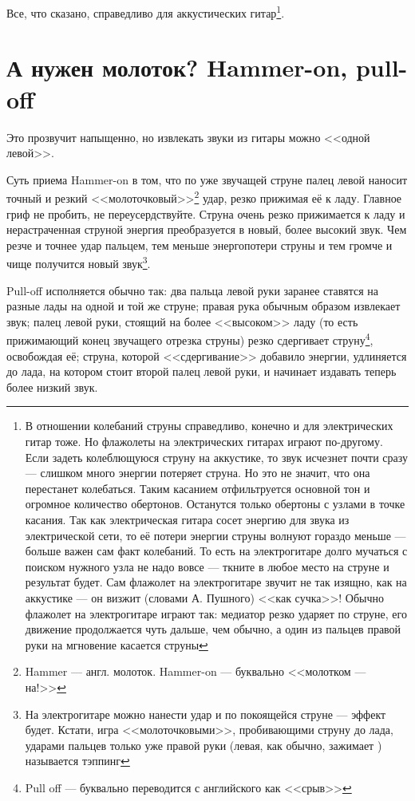 Все, что сказано, справедливо для аккустических гитар\footnote{В отношении колебаний струны справедливо, конечно и для электрических гитар тоже. Но флажолеты на электрических гитарах играют по-другому. Если задеть колеблющуюся струну на аккустике, то звук исчезнет почти сразу --- слишком много энергии потеряет струна. Но это не значит, что она перестанет колебаться. Таким касанием отфильтруется основной тон и огромное количество обертонов. Останутся только обертоны с узлами в точке касания. Так как электрическая гитара сосет энергию для звука из электрической сети, то её потери энергии струны волнуют гораздо меньше --- больше важен сам факт колебаний. То есть на электрогитаре долго мучаться с поиском нужного узла не надо вовсе --- ткните в любое место на струне и результат будет. Сам флажолет на электрогитаре звучит не так изящно, как на аккустике --- он визжит (словами А. Пушного) <<как сучка>>! Обычно флажолет на электрогитаре играют так: медиатор резко ударяет по струне, его движение продолжается чуть дальше, чем обычно, а один из пальцев правой руки на мгновение касается струны}.


\section{А нужен молоток? Hammer-on, pull-off}

Это прозвучит напыщенно, но извлекать звуки из гитары можно <<одной левой>>.

Суть приема Hammer-on в том, что по уже звучащей струне палец левой наносит точный и резкий <<молоточковый>>\footnote{Hammer --- англ. молоток. Hammer-on --- буквально <<молотком --- на!>>} удар, резко прижимая её к ладу. Главное гриф не пробить, не переусердствуйте. Струна очень резко прижимается к ладу и нерастраченная струной энергия преобразуется в новый, более высокий звук. Чем резче и точнее удар пальцем, тем меньше энергопотери струны и тем громче и чище получится новый звук\footnote{На электрогитаре можно нанести удар и по покоящейся струне --- эффект будет. Кстати, игра <<молоточковыми>>, пробивающими струну до лада, ударами пальцев только уже правой руки (левая, как обычно, зажимает ) называется тэппинг}.

Pull-off исполняется обычно так: два пальца левой руки заранее ставятся на разные лады на одной и той же струне; правая рука обычным образом извлекает звук; палец левой руки, стоящий на более <<высоком>> ладу (то есть прижимающий конец звучащего отрезка струны) резко сдергивает струну\footnote{Pull off --- буквально переводится с английского как <<срыв>>}, освобождая её; струна, которой <<сдергивание>> добавило энергии, удлиняется до лада, на котором стоит второй палец левой руки, и начинает издавать теперь более низкий звук.


